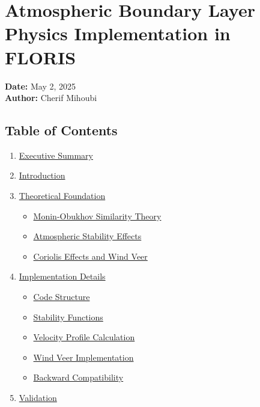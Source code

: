 \documentclass[
]{article}
\author{}
\date{}
\providecommand{\tightlist}{%
  \setlength{\itemsep}{0pt}\setlength{\parskip}{0pt}}
\begin{document}
\hypertarget{atmospheric-boundary-layer-physics-implementation-in-floris}{%
\section{Atmospheric Boundary Layer Physics Implementation in
FLORIS}\label{atmospheric-boundary-layer-physics-implementation-in-floris}}

\textbf{Date:} May 2, 2025\\
\textbf{Author:} Cherif Mihoubi

\hypertarget{table-of-contents}{%
\subsection{Table of Contents}\label{table-of-contents}}

\begin{enumerate}
\def\labelenumi{\arabic{enumi}.}
\tightlist
\item
  \protect\hyperlink{executive-summary}{Executive Summary}
\item
  \protect\hyperlink{introduction}{Introduction}
\item
  \protect\hyperlink{theoretical-foundation}{Theoretical Foundation}

  \begin{itemize}
  \tightlist
  \item
    \protect\hyperlink{monin-obukhov-similarity-theory}{Monin-Obukhov
    Similarity Theory}
  \item
    \protect\hyperlink{atmospheric-stability-effects}{Atmospheric
    Stability Effects}
  \item
    \protect\hyperlink{coriolis-effects-and-wind-veer}{Coriolis Effects
    and Wind Veer}
  \end{itemize}
\item
  \protect\hyperlink{implementation-details}{Implementation Details}

  \begin{itemize}
  \tightlist
  \item
    \protect\hyperlink{code-structure}{Code Structure}
  \item
    \protect\hyperlink{stability-functions}{Stability Functions}
  \item
    \protect\hyperlink{velocity-profile-calculation}{Velocity Profile
    Calculation}
  \item
    \protect\hyperlink{wind-veer-implementation}{Wind Veer
    Implementation}
  \item
    \protect\hyperlink{backward-compatibility}{Backward Compatibility}
  \end{itemize}
\item
  \protect\hyperlink{validation}{Validation}


\end{enumerate}
\end{document}
